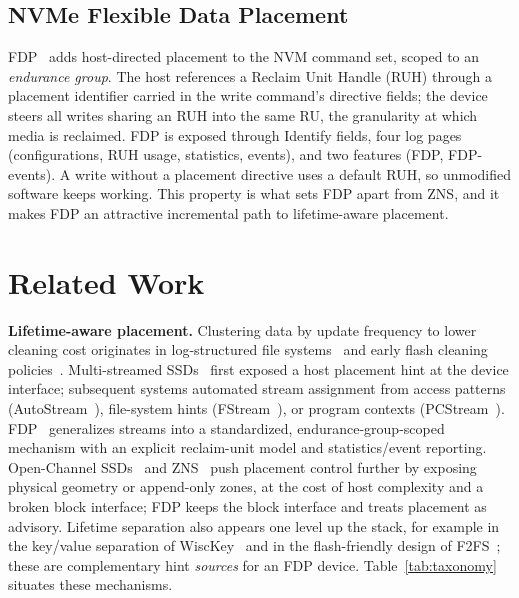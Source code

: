 \documentclass[conference,10pt]{IEEEtran}
\begin{document}
\subsection{NVMe Flexible Data Placement}
FDP~\cite{fdp:tp4146} adds host-directed placement to the NVM command set,
scoped to an \emph{endurance group}. The host references a Reclaim Unit Handle
(RUH) through a placement identifier carried in the write command's directive
fields; the device steers all writes sharing an RUH into the same RU, the
granularity at which media is reclaimed. FDP is exposed through Identify fields,
four log pages (configurations, RUH usage, statistics, events), and two features
(FDP, FDP-events). A write without a placement directive uses a default RUH, so
unmodified software keeps working. This property is what sets FDP apart from ZNS,
and it makes FDP an attractive incremental path to lifetime-aware placement.

\section{Related Work}
\label{sec:related}
\textbf{Lifetime-aware placement.} Clustering data by update frequency to lower
cleaning cost originates in log-structured file systems~\cite{lfs:tocs92} and
early flash cleaning policies~\cite{lifetime:hotcold}. Multi-streamed
SSDs~\cite{multistream:hotstorage14} first exposed a host placement hint at the
device interface; subsequent systems automated stream assignment from access
patterns (AutoStream~\cite{autostream:systor17}), file-system hints
(FStream~\cite{fstream:fast18}), or program contexts
(PCStream~\cite{pcstream:fast19}). FDP~\cite{fdp:tp4146} generalizes streams into
a standardized, endurance-group-scoped mechanism with an explicit reclaim-unit
model and statistics/event reporting. Open-Channel SSDs~\cite{lightnvm:fast17}
and ZNS~\cite{zns:atc21} push placement control further by exposing physical
geometry or append-only zones, at the cost of host complexity and a broken block
interface; FDP keeps the block interface and treats placement as advisory.
Lifetime separation also appears one level up the stack, for example in the
key/value separation of WiscKey~\cite{wisckey:fast16} and in the flash-friendly
design of F2FS~\cite{f2fs:fast15}; these are complementary hint \emph{sources}
for an FDP device. Table~\ref{tab:taxonomy} situates these mechanisms.
\end{document}
